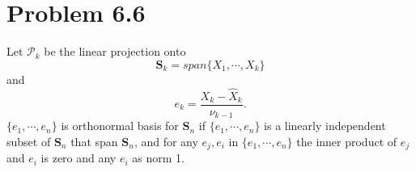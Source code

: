 \documentclass[11pt, oneside]{article}   	%
\begin{document}
\section{Problem 6.6}
Let $\mathcal{P}_{k}$ be the linear projection onto
\begin{equation}\label{eq:e}
\textbf{S}_{k} = span\{ X_{1},\cdots, X_{k}  \}
\end{equation}
and 
\begin{equation}\label{eq:e0}
e_{k} = \frac{X_{k}-\hat{X}_{k}}{\nu_{k-1}}.
\end{equation}
$\{e_{1},\cdots,e_{n}\}$
is orthonormal basis for $\textbf{S}_{n}$ if $\{e_{1},\cdots,e_{n}\}$ is a linearly independent subset of $\textbf{S}_{n}$ that span $\textbf{S}_{n}$, and for any $e_{j}, e_{i}$ in $\{e_{1},\cdots,e_{n}\}$ 
the inner product of $e_{j}$ and $e_{i}$ is zero and any $e_{i}$ as norm 1.
\justify
\end{document}

